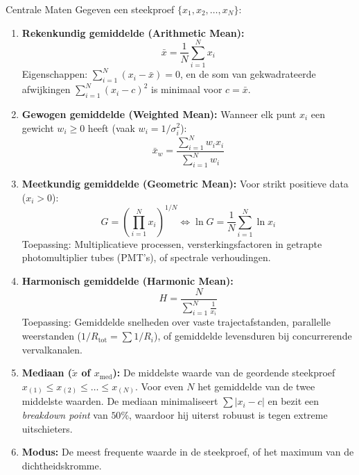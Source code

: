 \documentclass[11pt,a4paper]{article}
\begin{document}
\begin{defbox}{Centrale Maten}
Gegeven een steekproef $\{x_1, x_2, \ldots, x_N\}$:
\begin{enumerate}[leftmargin=1.2em]
    \item \textbf{Rekenkundig gemiddelde (Arithmetic Mean):}
    \begin{equation}
        \bar{x} = \frac{1}{N} \sum_{i=1}^N x_i
    \end{equation}
    Eigenschappen: $\sum_{i=1}^N (x_i - \bar{x}) = 0$, en de som van gekwadrateerde afwijkingen $\sum_{i=1}^N (x_i - c)^2$ is minimaal voor $c = \bar{x}$.
    \item \textbf{Gewogen gemiddelde (Weighted Mean):}
    Wanneer elk punt $x_i$ een gewicht $w_i \ge 0$ heeft (vaak $w_i = 1/\sigma_i^2$):
    \begin{equation}
        \bar{x}_w = \frac{\sum_{i=1}^N w_i x_i}{\sum_{i=1}^N w_i}
    \end{equation}
    \item \textbf{Meetkundig gemiddelde (Geometric Mean):}
    Voor strikt positieve data ($x_i > 0$):
    \begin{equation}
        G = \left( \prod_{i=1}^N x_i \right)^{1/N} \iff \ln G = \frac{1}{N} \sum_{i=1}^N \ln x_i
    \end{equation}
    Toepassing: Multiplicatieve processen, versterkingsfactoren in getrapte photomultiplier tubes (PMT's), of spectrale verhoudingen.
    \item \textbf{Harmonisch gemiddelde (Harmonic Mean):}
    \begin{equation}
        H = \frac{N}{\sum_{i=1}^N \frac{1}{x_i}}
    \end{equation}
    Toepassing: Gemiddelde snelheden over vaste trajectafstanden, parallelle weerstanden ($1/R_{\text{tot}} = \sum 1/R_i$), of gemiddelde levensduren bij concurrerende vervalkanalen.
    \item \textbf{Mediaan ($\tilde{x}$ of $x_{\text{med}}$):}
    De middelste waarde van de geordende steekproef $x_{(1)} \le x_{(2)} \le \ldots \le x_{(N)}$. Voor even $N$ het gemiddelde van de twee middelste waarden. De mediaan minimaliseert $\sum |x_i - c|$ en bezit een \emph{breakdown point} van $50\%$, waardoor hij uiterst robuust is tegen extreme uitschieters.
    \item \textbf{Modus:} De meest frequente waarde in de steekproef, of het maximum van de dichtheidskromme.
\end{enumerate}
\end{defbox}
\end{document}

